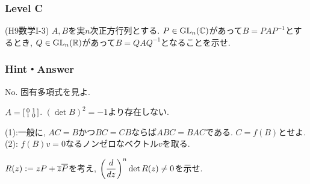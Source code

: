 \subsubsection{Level C}
\begin{prob} (H9数学I-3)
$A,B$を実$n$次正方行列とする. $P\in \mathrm{GL}_n(\mathbb{C})$があって$B=PAP^{-1}$とするとき, $Q\in \mathrm{GL}_{n}(\mathbb{R})$があって$B=QAQ^{-1}$となることを示せ.
\end{prob}


\subsubsection{Hint・Answer}

\begin{probans}
\end{probans}
\begin{probans}
No. 固有多項式を見よ.
\end{probans}
\begin{probans}
\end{probans}
\begin{probans}
$A=\left[\begin{smallmatrix}0&1\\ 1&0\end{smallmatrix}\right]$. $(\det{B})^2 = -1$より存在しない.
\end{probans}
\begin{probans}
(1):一般に, $AC = B$かつ$BC=CB$ならば$ABC=BAC$である. $C=f(B)$とせよ. \\
(2): $f(B)v = 0$なるノンゼロなベクトル$v$を取る.
\end{probans}

\begin{probans}
$R(z) := zP + \overline{z}\overline{P}$を考え, $\left( \dfrac{d}{dz} \right)^n \det{R(z)} \neq 0$を示せ.
\end{probans}









\newpage
